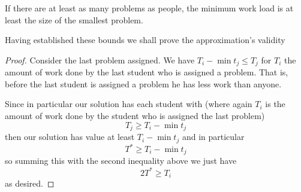 \documentclass{article}
\begin{document}
If there are at least as many problems as people, the minimum work load is at least the size of the smallest problem.

Having established these bounds we shall prove the approximation's validity
\begin{proof}
Consider the last problem assigned. We have $T_i- \min{t_j} \leq T_j$ for $T_i$ the amount of work done by the last student who is assigned a problem. That is, before the last student is assigned a problem he has less work than anyone. 

Since in particular our solution has each student with (where again $T_i$ is the amount of work done by the student who is assigned the last problem)
\[T_j \geq T_i - \min{t_j}\]
then our solution has value at least $T_i - \min{t_j}$ and in particular
\[T^*\geq T_i - \min{t_j}\] 
so summing this with the second inequality above we just have
\[2 T^* \geq T_i\]
as desired.
\end{proof}
\end{document}
